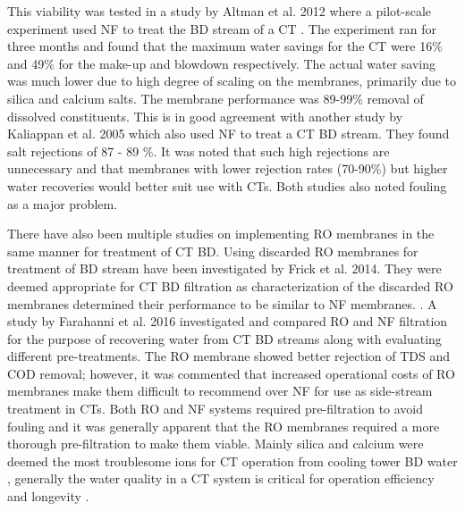 This viability was tested in a study by Altman et al. 2012 where a pilot-scale experiment used NF to treat the BD stream of a CT  \citep{altmanMembraneTreatmentSidestream2012}.
The experiment ran for three months and found that the maximum water savings for the CT were 16\% and 49\% for the make-up and blowdown respectively.
The actual water saving was much lower due to high degree of scaling on the membranes, primarily due to silica and calcium salts. 
The membrane performance was 89-99\% removal of dissolved constituents. \citep{altmanMembraneTreatmentSidestream2012} 
This is in good agreement with another study by Kaliappan et al. 2005 which also used NF to treat a CT BD stream. \citep{kaliappan_RecoveryReuseWater_2005}
They found salt rejections of 87 - 89 \%.
It was noted that such high rejections are unnecessary and that membranes with lower rejection rates (70-90\%) but higher water recoveries would better suit use with CTs. \citep{kaliappan_RecoveryReuseWater_2005}
Both studies also noted fouling as a major problem. \citep{altmanMembraneTreatmentSidestream2012}  \citep{kaliappan_RecoveryReuseWater_2005}


There have also been multiple studies on implementing RO membranes in the same manner for treatment of CT BD.
Using discarded RO membranes for treatment of BD stream have been investigated by Frick et al. 2014.  
They were deemed appropriate for CT BD filtration as characterization of the discarded RO membranes determined their performance to be similar to NF membranes. \citep{frickEvaluationPretreatmentsBlowdown2014}.
A study by Farahanni et al. 2016  investigated and compared RO and NF filtration for the purpose of recovering water from CT BD streams along with evaluating different pre-treatments. \citep{farahanniRecoveryCoolingTower_2016}
The RO membrane showed better rejection of TDS and COD removal; however, it was commented that increased operational costs of RO membranes make them difficult to recommend over NF for use as side-stream treatment in CTs.
Both RO and NF systems required pre-filtration to avoid fouling and it was generally apparent that the RO membranes required a more thorough pre-filtration to make them viable.  \citep{farahanniRecoveryCoolingTower_2016}
Mainly silica and calcium were deemed the most troublesome ions for CT operation from cooling tower BD water \citep{liaoTreatmentCoolingTower2009}, 
generally the water quality in a CT system is critical for operation efficiency and longevity \citep{IntroductionCoolingTower2014}.


